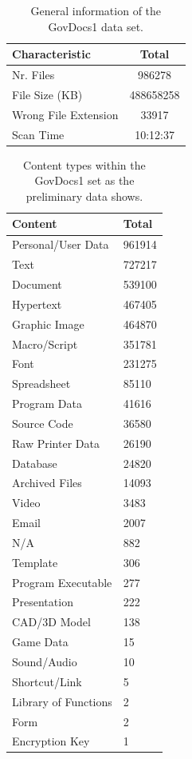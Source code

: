 \begin{table}[bh]
\centering
\begin{tabular}{l || c }
\hline
Characteristic & Total \\
\hline
\hline
Nr. Files & 986278 \\
File Size (KB) & 488658258 \\
Wrong File Extension & 33917 \\
Scan Time & 10:12:37 \\
\hline
\end{tabular}
\caption{General information of the GovDocs1 data set.}
\label{tab:govdoc1_general_info}
\end{table}
\clearpage

\begin{table}[th]
\centering
\begin{tabular}{l || l }
\hline
Content & Total \\
\hline
\hline
  Personal/User Data & 961914\\
  Text & 727217 \\
  Document & 539100 \\
  Hypertext & 467405 \\
  Graphic Image & 464870 \\
  Macro/Script &    351781 \\
  Font & 231275 \\
  Spreadsheet & 85110\\
  Program Data  &      41616\\
  Source Code & 36580 \\
  Raw Printer Data &  26190 \\
  Database & 24820 \\
  Archived Files & 14093 \\
  Video &  3483 \\
  Email & 2007 \\
  N/A  & 882 \\
  Template & 306\\
  Program Executable & 277\\
  Presentation & 222 \\
  CAD/3D Model & 138 \\
  Game Data &15\\
  Sound/Audio & 10 \\
  Shortcut/Link & 5 \\
  Library of Functions & 2\\
  Form & 2 \\
  Encryption Key  & 1\\
\hline
\end{tabular}
\label{tab:govdoc1_content}
\caption{Content types within the GovDocs1 set as the preliminary data shows.}
\end{table}

